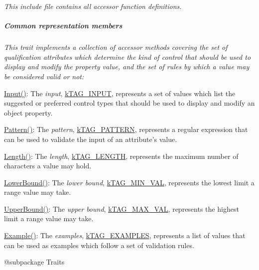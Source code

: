 {\itshape This include file contains all accessor function definitions. \subparagraph*{Common representation members}}

{\itshape }

{\itshape This trait implements a collection of accessor methods covering the set of qualification attributes which determine the kind of control that should be used to display and modify the property value, and the set of rules by which a value may be considered valid or not\-:}

{\itshape 
\begin{DoxyItemize}
\item {\ttfamily \hyperlink{}{Input()}}\-: The {\itshape input}, \hyperlink{}{k\-T\-A\-G\-\_\-\-I\-N\-P\-U\-T}, represents a set of values which list the suggested or preferred control types that should be used to display and modify an object property. 
\item {\ttfamily \hyperlink{}{Pattern()}}\-: The {\itshape pattern}, \hyperlink{}{k\-T\-A\-G\-\_\-\-P\-A\-T\-T\-E\-R\-N}, represents a regular expression that can be used to validate the input of an attribute's value. 
\item {\ttfamily \hyperlink{}{Length()}}\-: The {\itshape length}, \hyperlink{}{k\-T\-A\-G\-\_\-\-L\-E\-N\-G\-T\-H}, represents the maximum number of characters a value may hold. 
\item {\ttfamily \hyperlink{}{Lower\-Bound()}}\-: The {\itshape lower bound}, \hyperlink{}{k\-T\-A\-G\-\_\-\-M\-I\-N\-\_\-\-V\-A\-L}, represents the lowest limit a range value may take. 
\item {\ttfamily \hyperlink{}{Upper\-Bound()}}\-: The {\itshape upper bound}, \hyperlink{}{k\-T\-A\-G\-\_\-\-M\-A\-X\-\_\-\-V\-A\-L}, represents the highest limit a range value may take. 
\item {\ttfamily \hyperlink{}{Example()}}\-: The {\itshape examples}, \hyperlink{}{k\-T\-A\-G\-\_\-\-E\-X\-A\-M\-P\-L\-E\-S}, represents a list of values that can be used as examples which follow a set of validation rules. 
\end{DoxyItemize}}

{\itshape \begin{DoxyVerb} @subpackage        Traits\end{DoxyVerb}
 }